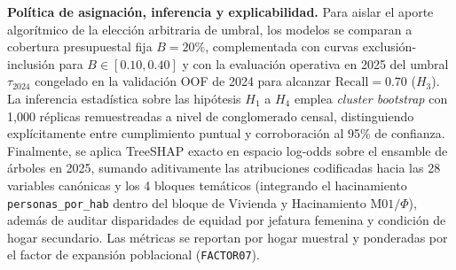 \textbf{Política de asignación, inferencia y explicabilidad.} Para aislar el aporte algorítmico de la elección arbitraria de umbral, los modelos se comparan a cobertura presupuestal fija $B = 20\%$, complementada con curvas exclusión-inclusión para $B \in [0.10, 0.40]$ \cite{noriega2020algorithmic} y con la evaluación operativa en 2025 del umbral $\tau_{2024}$ congelado en la validación OOF de 2024 para alcanzar $\text{Recall} = 0.70$ ($H_3$). La inferencia estadística sobre las hipótesis $H_1$ a $H_4$ emplea \textit{cluster bootstrap} con 1,000 réplicas remuestreadas a nivel de conglomerado censal, distinguiendo explícitamente entre cumplimiento puntual y corroboración al 95\% de confianza. Finalmente, se aplica TreeSHAP exacto \cite{lundberg2020local} en espacio log-odds sobre el ensamble de árboles en 2025, sumando aditivamente las atribuciones codificadas hacia las 28 variables canónicas y los 4 bloques temáticos (integrando el hacinamiento \texttt{personas\_por\_hab} dentro del bloque de Vivienda y Hacinamiento $\text{M01}/\Phi$), además de auditar disparidades de equidad por jefatura femenina y condición de hogar secundario. Las métricas se reportan por hogar muestral y ponderadas por el factor de expansión poblacional (\texttt{FACTOR07}).

